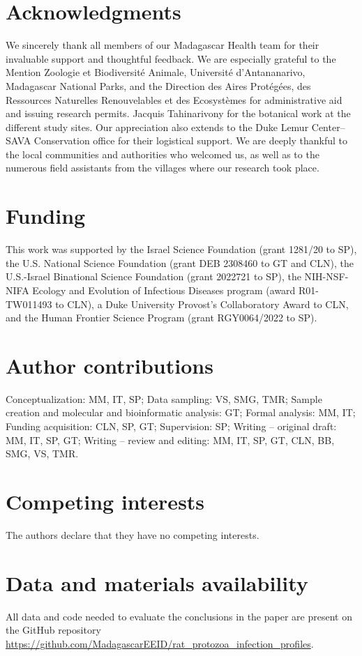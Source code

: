 \documentclass[oneside, a4paper, onecolumn, 11pt]{article}
\begin{document}
\section*{Acknowledgments}
We sincerely thank all members of our Madagascar Health team for their invaluable support and thoughtful feedback. We are especially grateful to the Mention Zoologie et Biodiversité Animale, Université d'Antananarivo, Madagascar National Parks, and the Direction des Aires Protégées, des Ressources Naturelles Renouvelables et des Ecosystèmes for administrative aid and issuing research permits. Jacquis Tahinarivony for the botanical work at the different study sites. Our appreciation also extends to the Duke Lemur Center–SAVA Conservation office for their logistical support. We are deeply thankful to the local communities and authorities who welcomed us, as well as to the numerous field assistants from the villages where our research took place.

\section*{Funding}
This work was supported by the Israel Science Foundation (grant 1281/20 to SP), the U.S. National Science Foundation (grant DEB 2308460 to GT and CLN), the U.S.-Israel Binational Science Foundation (grant 2022721 to SP), the NIH-NSF-NIFA Ecology and Evolution of Infectious Diseases program (award R01-TW011493 to CLN), a Duke University Provost’s Collaboratory Award to CLN, and the Human Frontier Science Program (grant RGY0064/2022 to SP).

\section*{Author contributions}
Conceptualization: MM, IT, SP; Data sampling: VS, SMG, TMR; Sample creation and molecular and bioinformatic analysis: GT; Formal analysis: MM, IT; Funding acquisition: CLN, SP, GT; Supervision: SP; Writing – original draft: MM, IT, SP, GT; Writing – review and editing: MM, IT, SP, GT, CLN, BB, SMG, VS, TMR.

\section*{Competing interests}
The authors declare that they have no competing interests.

\section*{Data and materials availability}
All data and code needed to evaluate the conclusions in the paper are present on the GitHub repository \url{https://github.com/MadagascarEEID/rat_protozoa_infection_profiles}.
\end{document}
